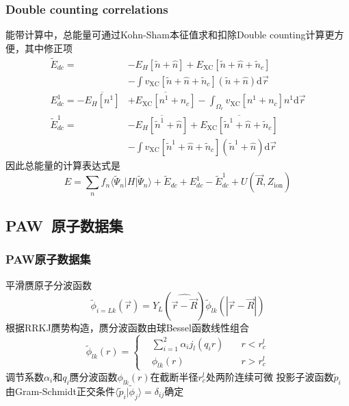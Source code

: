 \documentclass[cjk,slidestop,compress,mathserif,blue]{beamer}
\begin{document}
\frame
{
	\frametitle{\textrm{Double counting correlations}}
	能带计算中，总能量可通过\textrm{Kohn-Sham}本征值求和扣除\textrm{Double counting}计算更方便，其中修正项
	\begin{displaymath}
		\begin{aligned}
			\tilde E_{dc}=&-E_H[\tilde n+\hat n]+E_{\mathrm{XC}}[\tilde n+\hat n+\tilde n_c]\\
			&-\int v_{\mathrm{XC}}[\tilde n+\hat n+\tilde n_c](\tilde n+\hat n)\mathrm{d}\vec r\\
			E_{dc}^1=-\overline{E_H[n^1]}&+\overline{E_{\mathrm{XC}}[n^1+n_c]}-\int_{\Omega_r}v_{\mathrm{XC}}[n^1+n_c]n^1\mathrm{d}\vec r\\
			\tilde E_{dc}^1=&-\overline{E_H[\tilde n^1+\hat n]}+\overline{E_{\mathrm{XC}}[\tilde n^1+\hat n+\tilde n_c]}\\
			&-\int v_{\mathrm{XC}}[\tilde n^1+\hat n+\tilde n_c](\tilde n^1+\hat n)\mathrm{d}\vec r
		\end{aligned}
	\end{displaymath}
	因此总能量的计算表达式是
	$$E=\sum_nf_n\langle\tilde\Psi_n|H|\tilde\Psi_n\rangle+\tilde E_{dc}+E_{dc}^1-\tilde E_{dc}^1+U(\vec R,Z_{\mathrm{ion}})$$
}

\subsection{\rm{PAW~}原子数据集}
\frame
{
	\frametitle{\textrm{PAW}原子数据集}
	平滑赝原子分波函数
	\begin{displaymath}
		\tilde\phi_{i=Lk}(\vec r)=Y_L(\widehat{\vec r-\vec R})\tilde\phi_{lk}(|\vec r-\vec R|)
	\end{displaymath}
	根据\textrm{RRKJ}赝势构造，赝分波函数由球\textrm{Bessel}函数线性组合
	\begin{displaymath}
		\tilde\phi_{lk}(r)=\left\{
		\begin{aligned}
			&\sum_{i=1}^2\alpha_ij_l(q_ir)\quad &r<r_c^l\\
			&\phi_{lk}(r)\quad&r>r_c^l
		\end{aligned}
		\right.
	\end{displaymath}
	调节系数$\alpha_i$和$q_i$赝分波函数$\phi_{lk}(r)$在截断半径$r_c^l$处两阶连续可微
	投影子波函数$\tilde p_i$由\textrm{Gram-Schmidt}正交条件$\langle\tilde p_i|\tilde\phi_j\rangle=\delta_{ij}$确定
}
\end{document}
